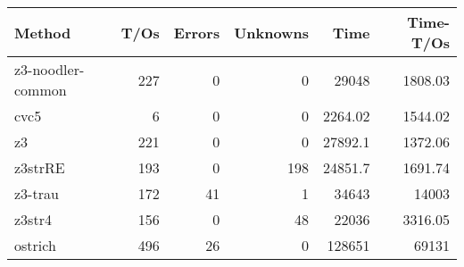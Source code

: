 \begin{tabular}{lrrrrr}
\hline
 Method            &   T/Os &   Errors &   Unknowns &      Time &   Time-T/Os \\
\hline
 z3-noodler-common &    227 &        0 &          0 &  29048    &     1808.03 \\
 cvc5              &      6 &        0 &          0 &   2264.02 &     1544.02 \\
 z3                &    221 &        0 &          0 &  27892.1  &     1372.06 \\
 z3strRE           &    193 &        0 &        198 &  24851.7  &     1691.74 \\
 z3-trau           &    172 &       41 &          1 &  34643    &    14003    \\
 z3str4            &    156 &        0 &         48 &  22036    &     3316.05 \\
 ostrich           &    496 &       26 &          0 & 128651    &    69131    \\
\hline
\end{tabular}
